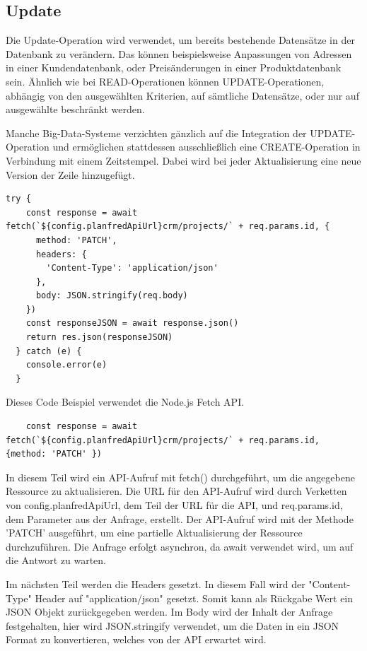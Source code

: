 \subsection{Update}

Die Update-Operation wird verwendet, um bereits bestehende Datensätze in der Datenbank zu verändern. Das können beispielsweise Anpassungen von Adressen in einer Kundendatenbank, oder Preisänderungen in einer Produktdatenbank sein. Ähnlich wie bei READ-Operationen können UPDATE-Operationen, abhängig von den ausgewählten Kriterien, auf sämtliche Datensätze, oder nur auf ausgewählte beschränkt werden.

Manche Big-Data-Systeme verzichten gänzlich auf die Integration der UPDATE-Operation und ermöglichen stattdessen ausschließlich eine CREATE-Operation in Verbindung mit einem Zeitstempel. Dabei wird bei jeder Aktualisierung eine neue Version der Zeile hinzugefügt.

\begin{lstlisting}[caption=Update-Operation]
try {
    const response = await fetch(`${config.planfredApiUrl}crm/projects/` + req.params.id, {
      method: 'PATCH',
      headers: {
        'Content-Type': 'application/json'
      },
      body: JSON.stringify(req.body)
    })
    const responseJSON = await response.json()
    return res.json(responseJSON)
  } catch (e) {
    console.error(e)
  }
\end{lstlisting}
\newpage
Dieses Code Beispiel verwendet die Node.js Fetch API. 

\begin{lstlisting}
    const response = await fetch(`${config.planfredApiUrl}crm/projects/` + req.params.id, {method: 'PATCH' })
\end{lstlisting}

In diesem Teil wird ein API-Aufruf mit fetch() durchgeführt, um die angegebene Ressource zu aktualisieren. Die URL für den API-Aufruf wird durch Verketten von config.planfredApiUrl, dem Teil der URL für die API, und req.params.id, dem Parameter aus der Anfrage, erstellt. Der API-Aufruf wird mit der Methode 'PATCH' ausgeführt, um eine partielle Aktualisierung der Ressource durchzuführen. Die Anfrage erfolgt asynchron, da await verwendet wird, um auf die Antwort zu warten.\newline

Im nächsten Teil werden die Headers gesetzt. In diesem Fall wird der "Content-Type" Header auf "application/json" gesetzt. Somit kann als Rückgabe Wert ein JSON Objekt zurückgegeben werden. Im Body wird der Inhalt der Anfrage festgehalten, hier wird JSON.stringify verwendet, um die Daten in ein JSON Format zu konvertieren, welches von der API erwartet wird.

